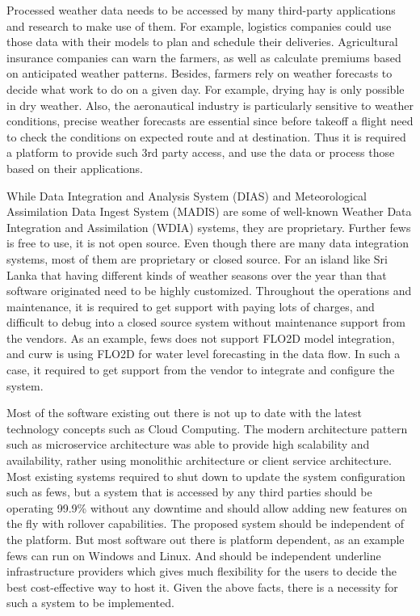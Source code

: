 Processed weather data needs to be accessed by many third-party applications and research to make use of them. For example, logistics companies could use those data with their models to plan and schedule their deliveries. Agricultural insurance companies can warn the farmers, as well as calculate premiums based on anticipated weather patterns. Besides, farmers rely on weather forecasts to decide what work to do on a given day. For example, drying hay is only possible in dry weather. Also, the aeronautical industry is particularly sensitive to weather conditions, precise weather forecasts are essential since before takeoff a flight need to check the conditions on expected route and at destination.
Thus it is required a platform to provide such 3rd party access, and use the data or process those based on their applications.

While Data Integration and Analysis System (DIAS) \cite{Kawasaki2018DataReduction} and Meteorological Assimilation Data Ingest System (MADIS) \cite{Macdermaid2005ARCHITECTUREP2.39} are some of well-known Weather Data Integration and Assimilation (WDIA) systems, they are proprietary. Further \acrfull{fews} \cite{Werner2013TheSystem} is free to use, it is not open source.
Even though there are many data integration systems, most of them are proprietary or closed source. For an island like Sri Lanka that having different kinds of weather seasons over the year than that software originated need to be highly customized. Throughout the operations and maintenance, it is required to get support with paying lots of charges, and difficult to debug into a closed source system without maintenance support from the vendors. As an example, \acrshort{fews} does not support FLO2D model integration, and \acrshort{curw} is using FLO2D for water level forecasting in the data flow. In such a case, it required to get support from the vendor to integrate and configure the system.

Most of the software existing out there is not up to date with the latest technology concepts such as Cloud Computing. The modern architecture pattern such as microservice architecture was able to provide high scalability and availability, rather using monolithic architecture or client service architecture. Most existing systems required to shut down to update the system configuration such as \acrshort{fews}, but a system that is accessed by any third parties should be operating 99.9\% without any downtime and should allow adding new features on the fly with rollover capabilities. The proposed system should be independent of the platform. But most software out there is platform dependent, as an example \acrshort{fews} can run on Windows and Linux. And should be independent underline infrastructure providers which gives much flexibility for the users to decide the best cost-effective way to host it. Given the above facts, there is a necessity for such a system to be implemented.

